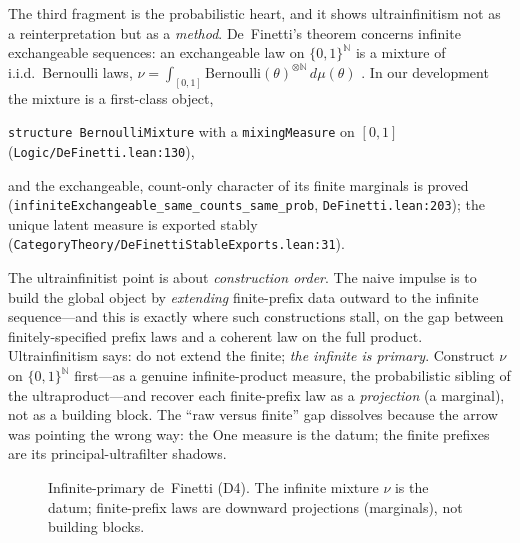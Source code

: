 \documentclass[]{article}
\theoremstyle{definition}
\theoremstyle{remark}
\newcommand{\code}[1]{\texttt{#1}}
\newcommand{\lpath}[1]{{\ttfamily\nolinkurl{#1}}}
\newcommand{\N}{\mathbb{N}}
\begin{document}
The third fragment is the probabilistic heart, and it shows ultrainfinitism not as
a reinterpretation but as a \emph{method}. De~Finetti's theorem concerns infinite
exchangeable sequences: an exchangeable law on $\{0,1\}^{\N}$ is a mixture of
i.i.d.\ Bernoulli laws, $\nu=\int_{[0,1]}\mathrm{Bernoulli}(\theta)^{\otimes\N}\,
d\mu(\theta)$ \cite{definetti1937, deFinetti1974}. In our development the mixture
is a first-class object,
\begin{center}
\code{structure BernoulliMixture} with a \code{mixingMeasure} on $[0,1]$
\quad(\lpath{Logic/DeFinetti.lean:130}),
\end{center}
and the exchangeable, count-only character of its finite marginals is proved
(\code{infiniteExchangeable\_same\_counts\_same\_prob},
\lpath{DeFinetti.lean:203}); the unique latent measure is exported stably
(\lpath{CategoryTheory/DeFinettiStableExports.lean:31}).

The ultrainfinitist point is about \emph{construction order}. The naive impulse is
to build the global object by \emph{extending} finite-prefix data outward to the
infinite sequence---and this is exactly where such constructions stall, on the gap
between finitely-specified prefix laws and a coherent law on the full product.
Ultrainfinitism says: do not extend the finite; \emph{the infinite is primary}.
Construct $\nu$ on $\{0,1\}^{\N}$ first---as a genuine infinite-product measure,
the probabilistic sibling of the ultraproduct---and recover each finite-prefix law
as a \emph{projection} (a marginal), not as a building block. The ``raw versus
finite'' gap dissolves because the arrow was pointing the wrong way: the One
measure is the datum; the finite prefixes are its principal-ultrafilter shadows.

\begin{figure}[H]
\centering
{}
\caption{Infinite-primary de~Finetti (D4). The infinite mixture $\nu$ is the datum;
finite-prefix laws are downward projections (marginals), not building blocks.}
\label{fig:definetti}
\end{figure}
\end{document}
